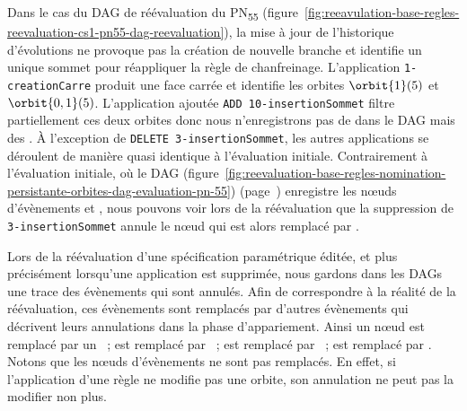 Dans le cas du DAG de réévaluation du PN\textsubscript{55}
(figure~\ref{fig:reeavulation-base-regles-reevaluation-cs1-pn55-dag-reevaluation}),
la mise à jour de l'historique d'évolutions ne provoque pas la création de
nouvelle branche et identifie un unique sommet pour réappliquer la règle de
chanfreinage. %
L'application \texttt{1-\allowbreak{}creation\-Carre} produit une face carrée et
identifie les orbites \(\orbit{1}(5)\) et \(\orbit{0,1}(5)\). %
L'application ajoutée \texttt{ADD~10-\allowbreak{}insertion\-Sommet} filtre
partiellement ces deux orbites donc nous n'enregistrons pas de
\noeffectnodeevent{} dans le DAG mais des \nomodifnodeevent{}. %
À l'exception de \texttt{DELETE~3-\allowbreak{}insertion\-Sommet}, les autres
applications se déroulent de manière quasi identique à l'évaluation initiale. %
Contrairement à l'évaluation initiale, où le DAG
(figure~\ref{fig:reevaluation-base-regles-nomination-persistante-orbites-dag-evaluation-pn-55})
(page~\pageref{fig:reevaluation-base-regles-nomination-persistante-orbites-dag-evaluation-pn-55})
enregistre les n\oe uds d'évènements \modifnodeevent{} et \nomodifnodeevent{},
nous pouvons voir lors de la réévaluation que la suppression de
\texttt{3-\allowbreak{}insertion\-Sommet} annule le n\oe ud \modifnodeevent{}
qui est alors remplacé par \nomodifnodeevent{}. %

Lors de la réévaluation d'une spécification paramétrique éditée, et plus
précisément lorsqu'une application est supprimée, nous gardons dans les DAGs une
trace des évènements qui sont annulés. %
Afin de correspondre à la réalité de la réévaluation, ces évènements sont remplacés
par d'autres évènements qui décrivent leurs annulations dans la phase
d'appariement. %
Ainsi un n\oe ud \creationnodeevent{} est remplacé par un
\nocreationnodeevent{}~; \splitnodeevent{} est remplacé par
\nosplitnodeevent{}~; \mergenodeevent{} est remplacé par \nomergenodeevent{}~;
\modifnodeevent{} est remplacé par \nomodifnodeevent{}. %
Notons que les n\oe uds d'évènements \nomodifnodeevent{} ne sont pas
remplacés. %
En effet, si l'application d'une règle ne modifie pas une orbite, son annulation ne
peut pas la modifier non plus. %

